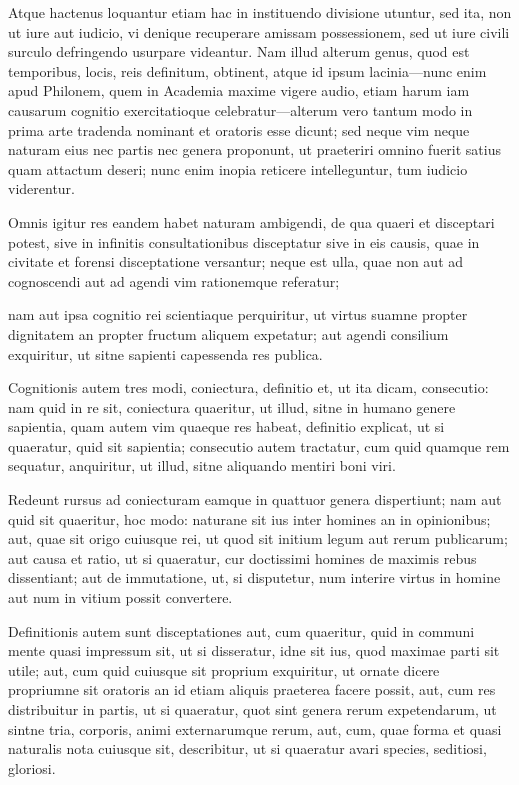  Atque hactenus loquantur etiam hac in instituendo divisione utuntur, sed ita, non ut iure aut iudicio, vi denique recuperare amissam possessionem, sed ut iure civili surculo defringendo usurpare videantur. Nam illud alterum genus, quod est temporibus, locis, reis definitum, obtinent, atque id ipsum lacinia—nunc enim apud Philonem, quem in Academia maxime vigere audio, etiam harum iam causarum cognitio exercitatioque celebratur—alterum vero tantum modo in prima arte tradenda nominant et oratoris esse dicunt; sed neque vim neque naturam eius nec partis nec genera proponunt, ut praeteriri omnino fuerit satius quam attactum deseri; nunc enim inopia reticere intelleguntur, tum iudicio viderentur.

 Omnis igitur res eandem habet naturam ambigendi, de qua quaeri et disceptari potest, sive in infinitis consultationibus disceptatur sive in eis causis, quae in civitate et forensi disceptatione versantur; neque est ulla, quae non aut ad cognoscendi aut ad agendi vim rationemque referatur;

 nam aut ipsa cognitio rei scientiaque perquiritur, ut virtus suamne propter dignitatem an propter fructum aliquem expetatur; aut agendi consilium exquiritur, ut sitne sapienti capessenda res publica.

 Cognitionis autem tres modi, coniectura, definitio et, ut ita dicam, consecutio: nam quid in re sit, coniectura quaeritur, ut illud, sitne in humano genere sapientia, quam autem vim quaeque res habeat, definitio explicat, ut si quaeratur, quid sit sapientia; consecutio autem tractatur, cum quid quamque rem sequatur, anquiritur, ut illud, sitne aliquando mentiri boni viri.

 Redeunt rursus ad coniecturam eamque in quattuor genera dispertiunt; nam aut quid sit quaeritur, hoc modo: naturane sit ius inter homines an in opinionibus; aut, quae sit origo cuiusque rei, ut quod sit initium legum aut rerum publicarum; aut causa et ratio, ut si quaeratur, cur doctissimi homines de maximis rebus dissentiant; aut de immutatione, ut, si disputetur, num interire virtus in homine aut num in vitium possit convertere.

 Definitionis autem sunt disceptationes aut, cum quaeritur, quid in communi mente quasi impressum sit, ut si disseratur, idne sit ius, quod maximae parti sit utile; aut, cum quid cuiusque sit proprium exquiritur, ut ornate dicere propriumne sit oratoris an id etiam aliquis praeterea facere possit, aut, cum res distribuitur in partis, ut si quaeratur, quot sint genera rerum expetendarum, ut sintne tria, corporis, animi externarumque rerum, aut, cum, quae forma et quasi naturalis nota cuiusque sit, describitur, ut si quaeratur avari species, seditiosi, gloriosi.

